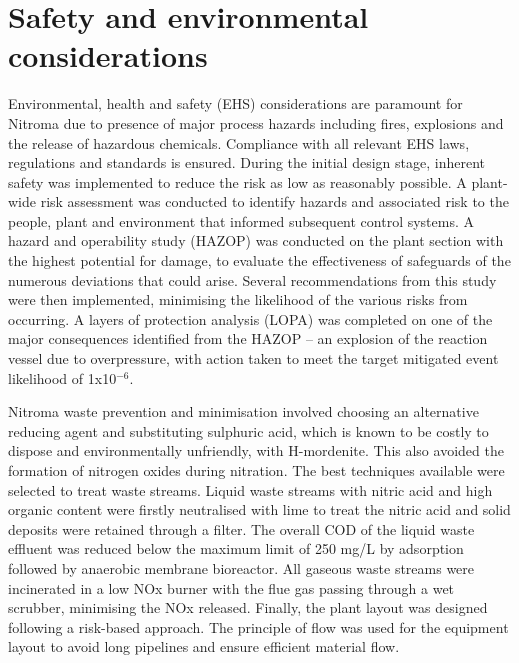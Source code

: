 \section*{Safety and environmental considerations}

Environmental, health and safety (EHS) considerations are paramount for Nitroma due to presence of major process hazards including fires, explosions and the release of hazardous chemicals. Compliance with all relevant EHS laws, regulations and standards is ensured.  During the initial design stage, inherent safety was implemented to reduce the risk as low as reasonably possible. A plant-wide risk assessment was conducted to identify hazards and associated risk to the people, plant and environment that informed subsequent control systems. A hazard and operability study (HAZOP) was conducted on the plant section with the highest potential for damage, to evaluate the effectiveness of safeguards of the numerous deviations that could arise. Several recommendations from this study were then implemented, minimising the likelihood of the various risks from occurring. A layers of protection analysis (LOPA) was completed on one of the major consequences identified from the HAZOP – an explosion of the reaction vessel due to overpressure, with action taken to meet the target mitigated event likelihood of 1x10$^{-6}$.  

Nitroma waste prevention and minimisation involved choosing an alternative reducing agent and substituting sulphuric acid, which is known to be costly to dispose and environmentally unfriendly, with H-mordenite. This also avoided the formation of nitrogen oxides during nitration. The best techniques available were selected to treat waste streams. Liquid waste streams with nitric acid and high organic content were firstly neutralised with lime to treat the nitric acid and solid deposits were retained through a filter. The overall COD of the liquid waste effluent was reduced below the maximum limit of 250 mg/L by adsorption followed by anaerobic membrane bioreactor. All gaseous waste streams were incinerated in a low NOx burner with the flue gas passing through a wet scrubber, minimising the NOx released. Finally, the plant layout was designed following a risk-based approach. The principle of flow was used for the equipment layout to avoid long pipelines and ensure efficient material flow. 